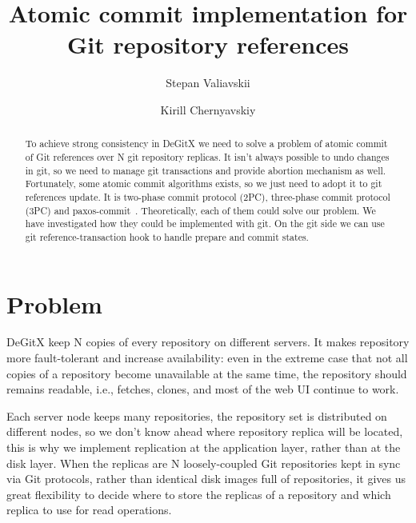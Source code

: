 \documentclass[sigplan, screen, nonacm, 11pt]{acmart}
\title{Atomic commit implementation for Git repository references}
\author{Stepan Valiavskii}
\author{Kirill Chernyavskiy}
\begin{document}
\begin{abstract}
  To achieve strong consistency in DeGitX we need to solve a problem of atomic commit of Git references
  over N git repository replicas.
  It isn't always possible to undo changes in git, so we need to manage git transactions
  and provide abortion mechanism as well.
  Fortunately, some atomic commit algorithms exists, so we just need to adopt it to git references update.
  It is two-phase commit protocol (2PC), three-phase commit protocol (3PC) and paxos-commit~\cite{paxos-commit}.
  Theoretically, each of them could solve our problem.
  We have investigated how they could be implemented with git.
  On the git side we can use git reference-transaction hook to handle prepare and commit states.
\end{abstract}

\maketitle

\section{Problem}

DeGitX keep N copies of every repository on different servers.
It makes repository more fault-tolerant and increase availability:
even in the extreme case that not all copies of a repository become unavailable at
the same time, the repository should remains readable, i.e., fetches, clones, and
most of the web UI continue to work.

Each server node keeps many repositories, the repository set is distributed on different nodes,
so we don't know ahead where repository replica will be located, this is why
we implement replication at the application layer, rather than at the disk layer.
When the replicas are N loosely-coupled Git repositories kept
in sync via Git protocols, rather than identical disk images full of repositories,
it gives us great flexibility to decide where to
store the replicas of a repository and which replica to use for read operations.
\end{document}

